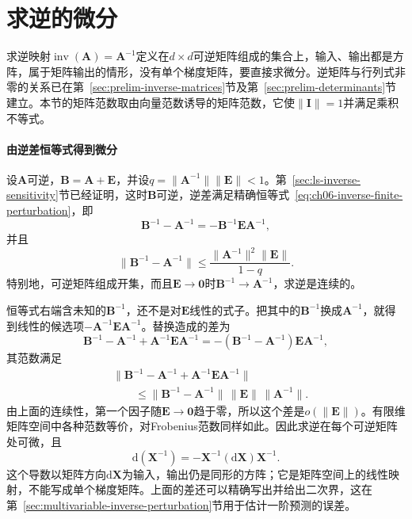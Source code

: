 \section{求逆的微分}
\label{sec:multivariable-inverse-differential}

求逆映射$\operatorname{inv}(\bm A)=\bm A^{-1}$定义在$d\times d$可逆矩阵组成的集合上，输入、输出都是方阵，属于矩阵输出的情形，没有单个梯度矩阵，要直接求微分。逆矩阵与行列式非零的关系已在第~\ref{sec:prelim-inverse-matrices}节及第~\ref{sec:prelim-determinants}节建立。本节的矩阵范数取由向量范数诱导的矩阵范数，它使$\lVert\bm I\rVert=1$并满足乘积不等式。

\paragraph{由逆差恒等式得到微分}
设$\bm A$可逆，$\bm B=\bm A+\bm E$，并设$q=\lVert\bm A^{-1}\rVert\lVert\bm E\rVert<1$。第~\ref{sec:ls-inverse-sensitivity}节已经证明，这时$\bm B$可逆，逆差满足精确恒等式~\eqref{eq:ch06-inverse-finite-perturbation}，即
\[
 \bm B^{-1}-\bm A^{-1}=-\bm B^{-1}\bm E\bm A^{-1},
\]
并且
\[
 \lVert\bm B^{-1}-\bm A^{-1}\rVert\leq\frac{\lVert\bm A^{-1}\rVert^2\lVert\bm E\rVert}{1-q}.
\]
特别地，可逆矩阵组成开集，而且$\bm E\to\bm0$时$\bm B^{-1}\to\bm A^{-1}$，求逆是连续的。

恒等式右端含未知的$\bm B^{-1}$，还不是对$\bm E$线性的式子。把其中的$\bm B^{-1}$换成$\bm A^{-1}$，就得到线性的候选项$-\bm A^{-1}\bm E\bm A^{-1}$。替换造成的差为
\[
 \bm B^{-1}-\bm A^{-1}+\bm A^{-1}\bm E\bm A^{-1}
 =-(\bm B^{-1}-\bm A^{-1})\bm E\bm A^{-1},
\]
其范数满足
\[
 \begin{aligned}
 &\bigl\lVert\bm B^{-1}-\bm A^{-1}+\bm A^{-1}\bm E\bm A^{-1}\bigr\rVert\\
 &\qquad\leq\lVert\bm B^{-1}-\bm A^{-1}\rVert\,\lVert\bm E\rVert\,\lVert\bm A^{-1}\rVert.
 \end{aligned}
\]
由上面的连续性，第一个因子随$\bm E\to\bm0$趋于零，所以这个差是$o(\lVert\bm E\rVert)$。有限维矩阵空间中各种范数等价，对Frobenius范数同样如此。因此求逆在每个可逆矩阵处可微，且
\begin{equation}
  \mathrm{d}(\bm{X}^{-1})
  =
  -\bm{X}^{-1}(\mathrm{d}\bm{X})\bm{X}^{-1}.
\label{eq:analysis-inverse-differential}
\end{equation}
这个导数以矩阵方向$\mathrm d\bm X$为输入，输出仍是同形的方阵；它是矩阵空间上的线性映射，不能写成单个梯度矩阵。上面的差还可以精确写出并给出二次界，这在第~\ref{sec:multivariable-inverse-perturbation}节用于估计一阶预测的误差。

